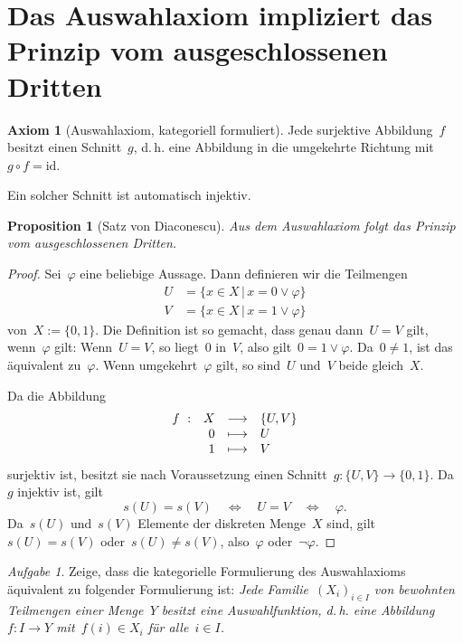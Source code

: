 \documentclass[a4paper,ngerman,12pt]{scrartcl}
\theoremstyle{definition}
\newtheorem{axiom}[defn]{Axiom}
\theoremstyle{plain}
\newtheorem{prop}[defn]{Proposition}
\theoremstyle{remark}
\newtheorem{aufg}[defn]{Aufgabe}
\newcommand{\id}{\mathrm{id}}
\renewcommand{\_}{\mathpunct{.}\,}
\newcommand{\?}{\,{:}\,}
\begin{document}
\appendix
\section{Das Auswahlaxiom impliziert das Prinzip vom ausgeschlossenen Dritten}

\label{appendix:axc}%
\begin{axiom}[Auswahlaxiom, kategoriell formuliert]Jede surjektive
Abbildung~$f$ besitzt einen Schnitt~$g$, d.\,h. eine Abbildung in die
umgekehrte Richtung mit~$g \circ f = \id$.\end{axiom}
Ein solcher Schnitt ist automatisch injektiv.

\begin{prop}[Satz von Diaconescu]Aus dem Auswahlaxiom folgt das Prinzip vom ausgeschlossenen
Dritten.\end{prop}
\begin{proof}Sei~$\varphi$ eine beliebige Aussage. Dann definieren wir die
Teilmengen
\begin{align*}
  U &= \{ x \in X \,|\, x = 0 \vee \varphi \} \\
  V &= \{ x \in X \,|\, x = 1 \vee \varphi \}
\end{align*}
von~$X := \{ 0, 1 \}$. Die Definition ist so gemacht, dass genau dann~$U = V$
gilt, wenn~$\varphi$ gilt: Wenn~$U = V$, so liegt~$0$ in~$V$, also gilt~$0 = 1
\vee \varphi$. Da~$0 \neq 1$, ist das äquivalent zu~$\varphi$. Wenn umgekehrt~$\varphi$
gilt, so sind~$U$ und~$V$ beide gleich~$X$.

Da die Abbildung
\[ \begin{array}{@{}rrcl@{}}
  f\ : & X &\longrightarrow& \{U,V\} \\
  & 0 &\longmapsto& U \\
  & 1 &\longmapsto& V
\end{array} \]
surjektiv ist, besitzt sie nach Voraussetzung
einen Schnitt~$g : \{U,V\} \to \{0,1\}$. Da~$g$ injektiv ist, gilt
\[ s(U) = s(V) \quad\Longleftrightarrow\quad U = V
\quad\Longleftrightarrow\quad \varphi. \]
Da~$s(U)$ und~$s(V)$ Elemente der diskreten Menge~$X$ sind, gilt~$s(U) = s(V)$
oder~$s(U) \neq s(V)$, also~$\varphi$ oder~$\neg\varphi$.
\end{proof}

\begin{aufg}Zeige, dass die kategorielle Formulierung des Auswahlaxioms
äquivalent zu folgender Formulierung ist: \emph{Jede Familie~$(X_i)_{i \in I}$
von bewohnten Teilmengen einer Menge~$Y$ besitzt eine Auswahlfunktion, d.\,h.
eine Abbildung~$f : I \to Y$ mit~$f(i) \in X_i$ für alle~$i \in I$.}\end{aufg}
\end{document}
